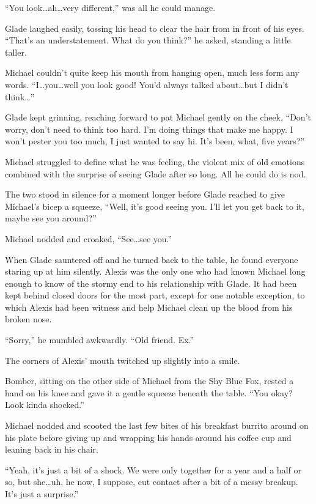 ``You look\ldots{}ah\ldots{}very different,'' was all he could manage.

Glade laughed easily, tossing his head to clear the hair from in front of his eyes. ``That's an understatement. What do you think?'' he asked, standing a little taller.

Michael couldn't quite keep his mouth from hanging open, much less form any words. ``I\ldots{}you\ldots{}well you look good! You'd always talked about\ldots{}but I didn't think\ldots{}''

Glade kept grinning, reaching forward to pat Michael gently on the cheek, ``Don't worry, don't need to think too hard. I'm doing things that make me happy. I won't pester you too much, I just wanted to say hi. It's been, what, five years?''

Michael struggled to define what he was feeling, the violent mix of old emotions combined with the surprise of seeing Glade after so long. All he could do is nod.

The two stood in silence for a moment longer before Glade reached to give Michael's bicep a squeeze, ``Well, it's good seeing you. I'll let you get back to it, maybe see you around?''

Michael nodded and croaked, ``See\ldots{}see you.''

When Glade sauntered off and he turned back to the table, he found everyone staring up at him silently. Alexis was the only one who had known Michael long enough to know of the stormy end to his relationship with Glade. It had been kept behind closed doors for the most part, except for one notable exception, to which Alexis had been witness and help Michael clean up the blood from his broken nose.

``Sorry,'' he mumbled awkwardly. ``Old friend. Ex.''

The corners of Alexis' mouth twitched up slightly into a smile.

Bomber, sitting on the other side of Michael from the Shy Blue Fox, rested a hand on his knee and gave it a gentle squeeze beneath the table. ``You okay? Look kinda shocked.''

Michael nodded and scooted the last few bites of his breakfast burrito around on his plate before giving up and wrapping his hands around his coffee cup and leaning back in his chair.

``Yeah, it's just a bit of a shock. We were only together for a year and a half or so, but she\ldots{}uh, he now, I suppose, cut contact after a bit of a messy breakup. It's just a surprise.''

